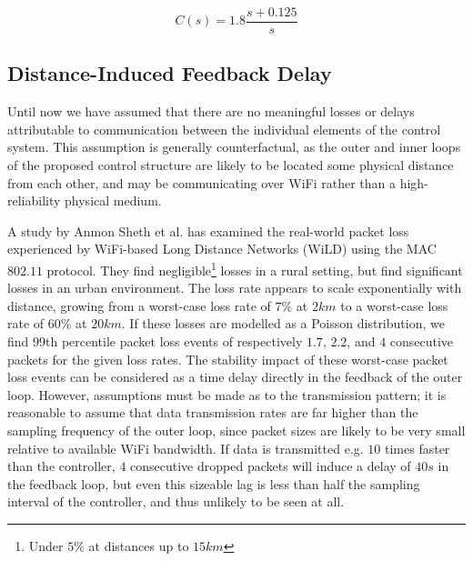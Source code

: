\begin{equation}\label{eq:PIDTransferFunction}
	C(s) = 1.8\frac{s+0.125}{s}
\end{equation}

\subsection{Distance-Induced Feedback Delay}\label{subsec:FeedbackDelay}

Until now we have assumed that there are no meaningful losses or delays attributable to communication between the individual elements of the control system. This assumption is generally counterfactual, as the outer and inner loops of the proposed control structure are likely to be located some physical distance from each other, and may be communicating over WiFi rather than a high-reliability physical medium.

A study by Anmon Sheth et al. \cite{Sheth2007} has examined the real-world packet loss experienced by WiFi-based Long Distance Networks (WiLD) using the MAC $802.11$ protocol. They find negligible\footnote{Under $5\%$ at distances up to $15 \si{km}$} losses in a rural setting, but find significant losses in an urban environment. The loss rate appears to scale exponentially with distance, growing from a worst-case loss rate of $7\%$ at $2\si{km}$ to a worst-case loss rate of $60\%$ at $20\si{km}$. If these losses are modelled as a Poisson distribution, we find $99$th percentile packet loss events of respectively $1.7$, $2.2$, and $4$ consecutive packets for the given loss rates. The stability impact of these worst-case packet loss events can be considered as a time delay directly in the feedback of the outer loop. However, assumptions must be made as to the transmission pattern; it is reasonable to assume that data transmission rates are far higher than the sampling frequency of the outer loop, since packet sizes are likely to be very small relative to available WiFi bandwidth. If data is transmitted e.g. $10$ times faster than the controller, $4$ consecutive dropped packets will induce a delay of $40 \si{s}$ in the feedback loop, but even this sizeable lag is less than half the sampling interval of the controller, and thus unlikely to be seen at all.






